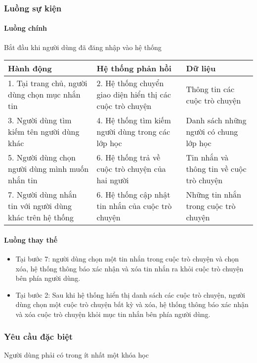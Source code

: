 \documentclass[./../main_file.tex]{subfiles}
\begin{document}
\subsubsection{Luồng sự kiện}
\paragraph{Luồng chính}
	Bắt đầu khi người dùng đã đăng nhập vào hệ thống

\begin{table}[H]
				\begin{tabular}{|p{.33\textwidth}|p{}|p{}|}
		\hline
		\textbf{Hành động}                             & \textbf{Hệ thống phản hồi}                                & \textbf{Dữ liệu}                       \\ \hline
		1. Tại trang chủ, người dùng chọn mục nhắn tin & 2. Hệ thống chuyển giao diện hiển thị các cuộc trò chuyện & Thông tin các cuộc trò chuyện          \\ \hline
		3. Người dùng tìm kiếm tên người dùng khác     & 4. Hệ thống tìm kiếm người dùng trong các lớp học         & Danh sách những người có chung lớp học \\ \hline
		5. Người dùng chọn người dùng mình muốn nhắn tin         & 6. Hệ thống trả về cuộc trò chuyện của hai người  & Tin nhắn và thông tin về cuộc trò chuyện \\ \hline
		7. Người dùng nhắn tin với người dùng khác trên hệ thống & 6. Hệ thống cập nhật tin nhắn của cuộc trò chuyện & Những tin nhắn trong cuộc trò chuyện     \\ \hline
	\end{tabular}
\end{table}
\paragraph{Luồng thay thế}
\begin{itemize}
	\item Tại bước 7: người dùng chọn một tin nhắn trong cuộc trò chuyện và chọn xóa, hệ thống thông báo xác nhận và xóa tin nhắn ra khỏi cuộc trò chuyện bên phía người dùng.
	\item Tại bước 2: Sau khi hệ thống hiển thị danh sách các cuộc trò chuyện, người dùng chọn một cuộc trò chuyện bất kỳ và xóa, hệ thống thông báo xác nhận và xóa cuộc trò chuyện khỏi mục tin nhắn bên phía người dùng.
	
\end{itemize}
\subsubsection{Yêu cầu đặc biệt}
Người dùng phải có trong ít nhất một khóa học
\end{document}
